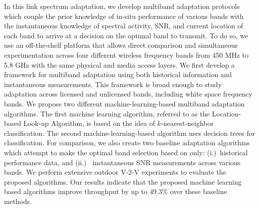 In this link spectrum adaptation, we develop multiband adaptation protocols 
which couple the prior knowledge of in-situ performance of various bands 
with the instantaneous knowledge of spectral activity, SNR, and current 
location of each band to arrive at a decision on the optimal band to transmit. 
To do so, we use an off-the-shelf platform that allows direct comparison and 
simultaneous experimentation across four different wireless frequency bands 
from 450 MHz to 5.8 GHz with the same physical and media access layers. 
We first develop a framework for multiband adaptation using both historical 
information and instantaneous measurements. This framework is broad enough 
to study adaptation across licensed and unlicensed bands, including white 
space frequency bands. We propose two different machine-learning-based 
multiband adaptation algorithms. The first machine learning algorithm, 
referred to as the Location-based Look-up Algorithm, is based on the idea 
of $k$-nearest-neighbor classification. The second machine-learning-based 
algorithm uses decision trees for classification. For comparison, we also 
create two baseline adaptation algorithms which attempt to make the optimal
band selection based on only: (i.)~historical performance data, and (ii.)
~instantaneous SNR measurements across various bands. We perform extensive 
outdoor V-2-V experiments to evaluate the proposed algorithms. Our results 
indicate that the proposed machine learning based algorithms improve throughput 
by up to $49.3\%$ over these baseline methods.


